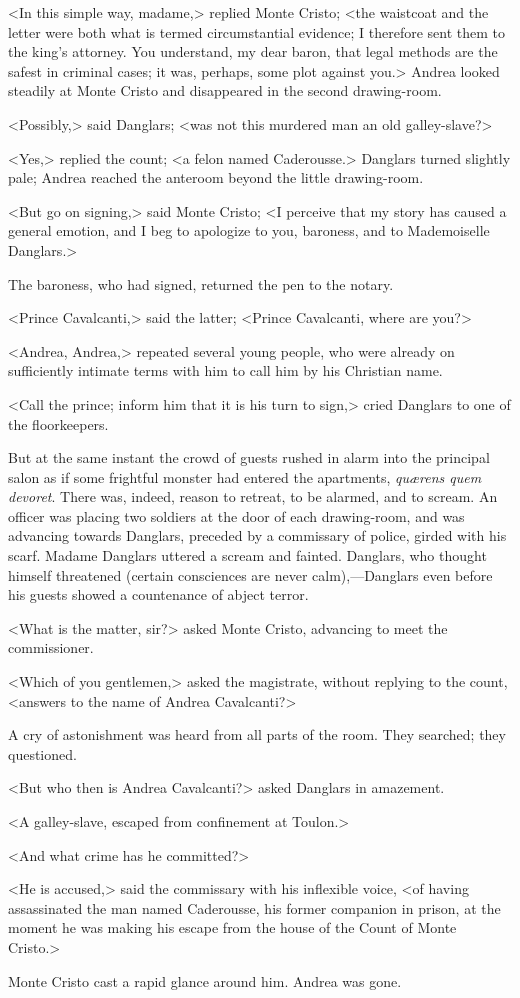  <In this simple way, madame,> replied Monte Cristo; <the waistcoat and the letter were both what is termed circumstantial evidence; I therefore sent them to the king's attorney. You understand, my dear baron, that legal methods are the safest in criminal cases; it was, perhaps, some plot against you.> Andrea looked steadily at Monte Cristo and disappeared in the second drawing-room. 

 <Possibly,> said Danglars; <was not this murdered man an old galley-slave?>

<Yes,> replied the count; <a felon named Caderousse.> Danglars turned slightly pale; Andrea reached the anteroom beyond the little drawing-room. 

 <But go on signing,> said Monte Cristo; <I perceive that my story has caused a general emotion, and I beg to apologize to you, baroness, and to Mademoiselle Danglars.> 

 The baroness, who had signed, returned the pen to the notary. 

 <Prince Cavalcanti,> said the latter; <Prince Cavalcanti, where are you?> 

 <Andrea, Andrea,> repeated several young people, who were already on sufficiently intimate terms with him to call him by his Christian name. 

 <Call the prince; inform him that it is his turn to sign,> cried Danglars to one of the floorkeepers. 

 But at the same instant the crowd of guests rushed in alarm into the principal salon as if some frightful monster had entered the apartments, \textit{quærens quem devoret}. There was, indeed, reason to retreat, to be alarmed, and to scream. An officer was placing two soldiers at the door of each drawing-room, and was advancing towards Danglars, preceded by a commissary of police, girded with his scarf. Madame Danglars uttered a scream and fainted. Danglars, who thought himself threatened (certain consciences are never calm),—Danglars even before his guests showed a countenance of abject terror. 

 <What is the matter, sir?> asked Monte Cristo, advancing to meet the commissioner. 

 <Which of you gentlemen,> asked the magistrate, without replying to the count, <answers to the name of Andrea Cavalcanti?> 

 A cry of astonishment was heard from all parts of the room. They searched; they questioned. 

 <But who then is Andrea Cavalcanti?> asked Danglars in amazement. 

 <A galley-slave, escaped from confinement at Toulon.> 

 <And what crime has he committed?> 

 <He is accused,> said the commissary with his inflexible voice, <of having assassinated the man named Caderousse, his former companion in prison, at the moment he was making his escape from the house of the Count of Monte Cristo.> 

 Monte Cristo cast a rapid glance around him. Andrea was gone. 